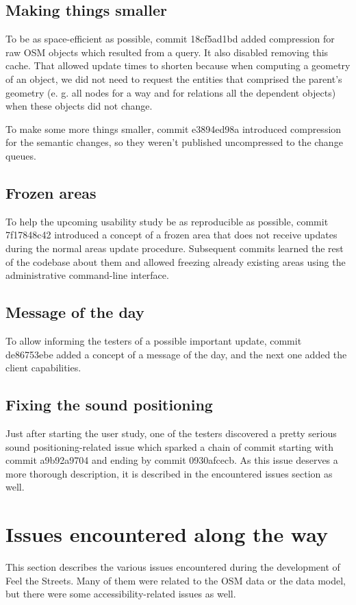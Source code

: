 \documentclass[nolof,digital]{fithesis3}
\begin{document}
\subsection{Making things smaller}
To be as space-efficient as possible, commit 18cf5ad1bd added compression for raw OSM objects which resulted from a query. It also disabled removing this cache. That allowed update times to shorten because when computing a geometry of an object, we did not need to request the entities that comprised the parent's geometry (e. g. all nodes for a way and for relations all the dependent objects) when these objects did not change.

To make some more things smaller, commit e3894ed98a introduced compression for the semantic changes, so they weren't published uncompressed to the change queues.
\subsection{Frozen areas}
To help the upcoming usability study be as reproducible as possible, commit 7f17848c42 introduced a concept of a frozen area that does not receive updates during the normal areas update procedure. Subsequent commits learned the rest of the codebase about them and allowed freezing already existing areas using the administrative command-line interface.
\subsection{Message of the day}
To allow informing the testers of a possible important update, commit de86753ebe added a concept of a message of the day, and the next one added the client capabilities.
\subsection{Fixing the sound positioning}
Just after starting the user study, one of the testers discovered a pretty serious sound positioning-related issue which sparked a chain of commit starting with commit a9b92a9704 and ending by commit 0930afcecb. As this issue deserves a more thorough description, it is described in the encountered issues section as well.
\section{Issues encountered along the way}
This section describes the various issues encountered during the development of Feel the Streets. Many of them were related to the OSM data or the data model, but there were some accessibility-related issues as well.
\end{document}
